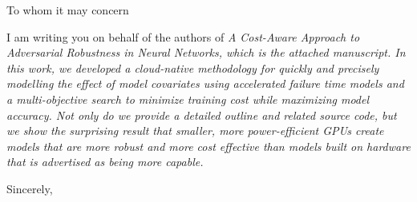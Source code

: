 \documentclass{letter}
\begin{document}
\begin{letter}{}
\opening{To whom it may concern}

I am writing you on behalf of the authors of \em{A Cost-Aware Approach to Adversarial Robustness in Neural Networks}, which is the attached manuscript.  In this work, we developed a cloud-native methodology for quickly and precisely modelling the effect of model covariates using accelerated failure time models and a multi-objective search to minimize training cost while maximizing model accuracy. Not only do we provide a detailed outline and related source code, but we show the surprising result that smaller, more power-efficient GPUs create models that are more robust and more cost effective than models built on hardware that is advertised as being more capable. 
\closing{Sincerely,}
\end{letter}
\end{document}
